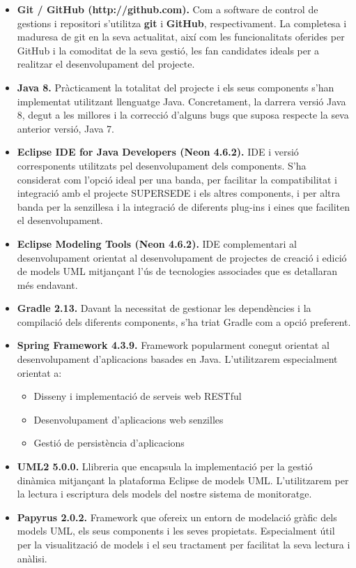 \begin{itemize}
\item \textbf{Git / GitHub (http://github.com).} Com a software de control de gestions i repositori s'utilitza \textbf{git} i \textbf{GitHub}, respectivament. La completesa i maduresa de git en la seva actualitat, així com les funcionalitats oferides per GitHub i la comoditat de la seva gestió, les fan candidates ideals per a realitzar el desenvolupament del projecte.
\item \textbf{Java 8.} Pràcticament la totalitat del projecte i els seus components s'han implementat utilitzant llenguatge Java. Concretament, la darrera versió Java 8, degut a les millores i la correcció d'alguns bugs que suposa respecte la seva anterior versió, Java 7.
\item \textbf{Eclipse IDE for Java Developers (Neon 4.6.2).} IDE i versió corresponents utilitzats pel desenvolupament dels components. S'ha considerat com l'opció ideal per una banda, per facilitar la compatibilitat i integració amb el projecte SUPERSEDE i els altres components, i per altra banda per la senzillesa i la integració de diferents plug-ins i eines que faciliten el desenvolupament. 
\item \textbf{Eclipse Modeling Tools (Neon 4.6.2).}  IDE complementari al desenvolupament orientat al desenvolupament de projectes de creació i edició de models UML mitjançant l'ús de tecnologies associades que es detallaran més endavant. 
\item \textbf{Gradle 2.13.} Davant la necessitat de gestionar les dependències i la compilació dels diferents components, s'ha triat Gradle com a opció preferent.
\item \textbf{Spring Framework 4.3.9.} Framework popularment conegut orientat al desenvolupament d'aplicacions basades en Java. L'utilitzarem especialment orientat a:
\begin{itemize}
\item Disseny i implementació de serveis web RESTful
\item Desenvolupament d'aplicacions web senzilles
\item Gestió de persistència d'aplicacions
\end{itemize}
\item \textbf{UML2 5.0.0.} Llibreria que encapsula la implementació per la gestió dinàmica mitjançant la plataforma Eclipse de models UML. L'utilitzarem per la lectura i escriptura dels models del nostre sistema de monitoratge.
\item \textbf{Papyrus 2.0.2.} Framework que ofereix un entorn de modelació gràfic dels models UML, els seus components i les seves propietats. Especialment útil per la visualització de models i el seu tractament per facilitat la seva lectura i anàlisi.
\end{itemize}